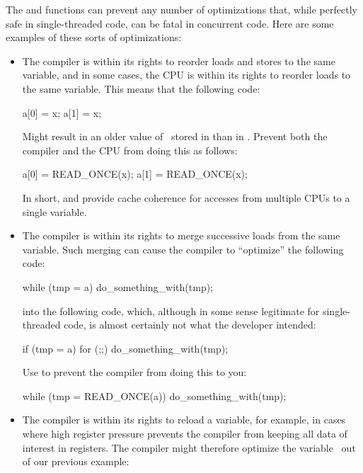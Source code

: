 The  and  functions can prevent any number of
optimizations that, while perfectly safe in single-threaded code, can
be fatal in concurrent code.
Here are some examples of these sorts of optimizations:

\begin{itemize}
 \item
     The compiler is within its rights to reorder loads and stores
     to the same variable, and in some cases, the CPU is within its
     rights to reorder loads to the same variable.
     This means that the following code:

\begin{VerbatimU}
	a[0] = x;
	a[1] = x;
\end{VerbatimU}

     Might result in an older value of~ stored in  than in .
     Prevent both the compiler and the CPU from doing this as follows:

\begin{VerbatimU}
	a[0] = READ_ONCE(x);
	a[1] = READ_ONCE(x);
\end{VerbatimU}

     In short,  and  provide cache coherence
     for accesses from multiple CPUs to a single variable.

 \item
     The compiler is within its rights to merge successive loads from
     the same variable.
     Such merging can cause the compiler to ``optimize'' the following code:

\begin{VerbatimU}
	while (tmp = a)
		do_something_with(tmp);
\end{VerbatimU}

     into the following code, which, although in some sense legitimate
     for single-threaded code, is almost certainly not what the developer
     intended:

\begin{VerbatimU}
	if (tmp = a)
		for (;;)
			do_something_with(tmp);
\end{VerbatimU}

     Use  to prevent the compiler from doing this to you:

\begin{VerbatimU}
	while (tmp = READ_ONCE(a))
		do_something_with(tmp);
\end{VerbatimU}

 \item
     The compiler is within its rights to reload a variable, for example,
     in cases where high register pressure prevents the compiler from
     keeping all data of interest in registers.
     The compiler might therefore optimize the variable~ out of
     our previous example:


\end{itemize}
